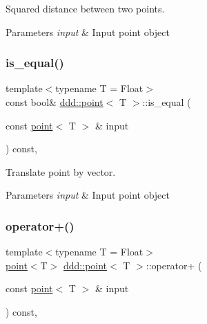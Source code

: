 Squared distance between two points. 


\begin{DoxyParams}{Parameters}
{\em input} & Input point object \\
\hline
\end{DoxyParams}
\mbox{\label{classddd_1_1point_ac18ef1f91134bce9bcfe8d8419ab0f2b}} 
\subsubsection{\texorpdfstring{is\+\_\+equal()}{is\_equal()}}
{\footnotesize\ttfamily template$<$typename T = Float$>$ \\
const bool\& \hyperlink{classddd_1_1point}{ddd\+::point}$<$ T $>$\+::is\+\_\+equal (\begin{DoxyParamCaption}\item[{const \hyperlink{classddd_1_1point}{point}$<$ T $>$ \&}]{input }\end{DoxyParamCaption}) const\hspace{0.3cm}{\ttfamily [inline]}, {\ttfamily [inherited]}}



Translate point by vector. 


\begin{DoxyParams}{Parameters}
{\em input} & Input point object \\
\hline
\end{DoxyParams}
\mbox{\label{classddd_1_1point_ab0b0c990b117bb889d34d44509b645be}} 
\subsubsection{\texorpdfstring{operator+()}{operator+()}}
{\footnotesize\ttfamily template$<$typename T = Float$>$ \\
\hyperlink{classddd_1_1point}{point}$<$T$>$ \hyperlink{classddd_1_1point}{ddd\+::point}$<$ T $>$\+::operator+ (\begin{DoxyParamCaption}\item[{const \hyperlink{classddd_1_1point}{point}$<$ T $>$ \&}]{input }\end{DoxyParamCaption}) const\hspace{0.3cm}{\ttfamily [inline]}, {\ttfamily [inherited]}}



